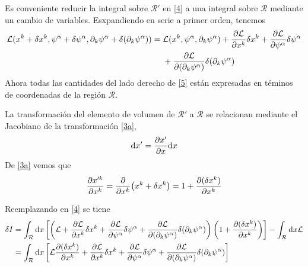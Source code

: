 Es conveniente reducir la integral sobre $\mathcal{R'}$ en \eqref{4} a una integral sobre $\mathcal{R}$ mediante un cambio de variables. Esxpandiendo en serie a primer orden, tenemos
\begin{equation}\label{5}
\begin{split}
  \mathcal{L} (x^k+\delta x^k,\psi^\alpha+\delta\psi^\alpha,\partial_k\psi^\alpha+\delta(\partial_k\psi^\alpha))&=\mathcal{L}(x^k,\psi^\alpha,\partial_k\psi^\alpha) +\pdv{\mathcal{L}}{x^k}\delta x^k+\pdv{\mathcal{L}}{\psi^\alpha}\delta\psi^\alpha\\
  &~~~~+\pdv{\mathcal{L}}{(\partial_k\psi^\alpha)}\delta(\partial_k\psi^\alpha)
 \end{split}
\end{equation}
Ahora todas las cantidades del lado derecho de \eqref{5} están expresadas en téminos de coordenadas de la región $\mathcal{R}$.

La transformación del elemento de volumen de $\mathcal{R'}$ a $\mathcal{R}$ se relacionan mediante el Jacobiano de la transformación \eqref{3a},
\begin{equation}
  \dd x'=\pdv{x'}{x}\dd x
\end{equation}
De \eqref{3a} vemos que
\begin{align}
  \pdv{x'^k}{x^k}=\pdv{x^k}(x^k+\delta x^k)=1+\pdv{(\delta x^k)}{x^k}
\end{align}

Reemplazando en \eqref{4} se tiene
\begin{align}
  \nonumber\delta I&=\int_{\mathcal{R}} \dd x\left[\left(\mathcal{L}+\pdv{\mathcal{L}}{x^k}\delta x^k+\pdv{\mathcal{L}}{\psi^\alpha}\delta\psi^\alpha+\pdv{\mathcal{L}}{(\partial_k\psi^\alpha)}\delta(\partial_k\psi^\alpha)\right)\left(1+\pdv{(\delta x^k)}{x^k}\right)\right]-\int_{\mathcal{R}} \dd x\mathcal{L}\\
  &=\int_{\mathcal{R}}\dd x\left[\mathcal{L} \pdv{(\delta x^k)}{x^k}+\pdv{\mathcal{L}}{x^k}\delta x^k+\pdv{\mathcal{L}}{\psi^\alpha}\delta\psi^\alpha+\pdv{\mathcal{L}}{(\partial_k\psi^\alpha)}\delta(\partial_k\psi^\alpha)\right]\label{8}
\end{align}

